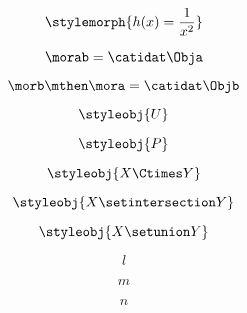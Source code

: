 {\begin{forslides}
        \begin{equation}
            \label{eq:semicats-slides-30}
            \stylemorph{h(x) = \frac{1}{x^2}}
        \end{equation}

        \begin{equation}
            \label{eq:semicats-slides-31}
            \morab = \catidat\Obja
        \end{equation}

        \begin{equation}
            \label{eq:semicats-slides-32}
            \morb \mthen \mora = \catidat\Objb
        \end{equation}

        \begin{equation}
            \label{eq:semicats-slides-33}
            \styleobj{U}
        \end{equation}

        \begin{equation}
            \label{eq:semicats-slides-34}
            \styleobj{P}
        \end{equation}

        \begin{equation}
            \label{eq:semicats-slides-35}
            \styleobj{X \Ctimes Y}
        \end{equation}

        \begin{equation}
            \label{eq:semicats-slides-36}
            \styleobj{X \setintersection Y}
        \end{equation}

        \begin{equation}
            \label{eq:semicats-slides-37}
            \styleobj{X \setunion Y}
        \end{equation}

        \begin{equation}
            \label{eq:semicats-slides-38}
            l
        \end{equation}

        \begin{equation}
            \label{eq:semicats-slides-39}
            m
        \end{equation}

        \begin{equation}
            \label{eq:semicats-slides-40}
            n
        \end{equation}


\end{forslides}}
